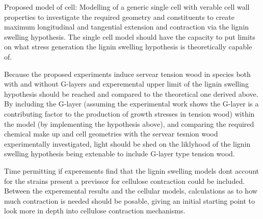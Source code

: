 \documentclass{article}
\begin{document}
%
%
%
%
%
%
%
%
%
%
%


Proposed model of cell:
Modelling of a generic single cell with verable cell wall properties to
investigate the required geometry and constituents to create maximum
longitudinal and tangential extension and contraction via the lignin swelling
hypothesis. The single cell model should have the capacity to put limits on what
stress generation the lignin swelling hypothesis is theoretically capable of.

Because the proposed experiments induce servear tension wood in species both
with and without G-layers and experemental upper limit of the lignin swelling
hypothesis should be reached and compared to the theoretical one derived above.
By including the G-layer (assuming the experimental work shows the G-layer is a
contributing factor to the production of growth stresses in tension wood) within
the model (by implementing the hypothesis above), and comparing the required
chemical make up and cell geometries with the servear tesnion wood
experimentally investigated, light should be shed on the liklyhood of the lignin
swelling hypothesis being extenable to include G-layer type tension wood.

Time permitting if experements find that the lignin swelling models dont account
for the strains present a previssor for cellulose contraction could be included.
Between the experemental results and the cellular models, calculations as to how
much contraction is needed should be posable, giving an initial starting point to
look more in depth into cellulose contraction mechanisms.
\end{document}
